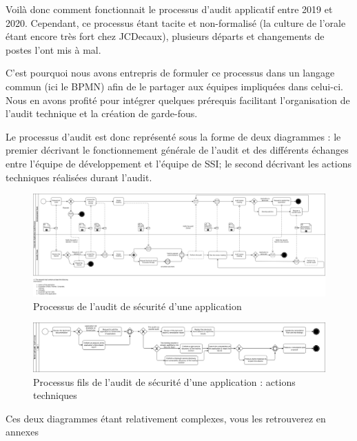 Voilà donc comment fonctionnait le processus d'audit applicatif entre 2019 et 2020. 
\newline Cependant, ce processus étant tacite et non-formalisé (la culture de l'orale étant encore très fort chez 
JCDecaux), plusieurs départs et changements de postes l'ont mis à mal.

C'est pourquoi nous avons entrepris de formuler ce processus dans un langage commun (ici le \ac{BPMN}) afin de le partager
aux équipes impliquées dans celui-ci. Nous en avons profité pour intégrer quelques prérequis facilitant l'organisation 
de l'audit technique et la création de garde-fous.

\newpage

Le processus d'audit est donc représenté sous la forme de deux diagrammes : le premier décrivant le fonctionnement 
générale de l'audit et des différents échanges entre l'équipe de développement et l'équipe de \ac{SSI}; le second 
décrivant les actions techniques réalisées durant l'audit.

\begin{figure}[h]
    \centering
    \includegraphics[width=\linewidth]{resources/img/process_audit.png}
    \caption{Processus de l'audit de sécurité d'une application}
\end{figure}

\begin{figure}[h]
    \centering
    \includegraphics[width=\linewidth]{resources/img/technical_audit_subprocess.png}
    \caption{Processus fils de l'audit de sécurité d'une application : actions techniques}
\end{figure}
\begin{center}
    \colorbox{gray!15}{Ces deux diagrammes étant relativement complexes, vous les retrouverez en annexes}
\end{center}


